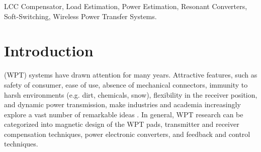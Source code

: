 \documentclass[journal,a4paper]{IEEEtran}
\begin{document}
\begin{IEEEkeywords}
LCC Compensator, Load Estimation, Power Estimation, Resonant Converters, Soft-Switching, Wireless Power Transfer Systems.
\end{IEEEkeywords}

\IEEEpeerreviewmaketitle



\section{Introduction}

 (WPT) systems have drawn attention for many years. Attractive features, such as safety of consumer, ease of use, absence of mechanical connectors, immunity to harsh environments (e.g. dirt, chemicals, snow), flexibility in the receiver position, and dynamic power transmission, make industries and academia increasingly explore a vast number of remarkable ideas \cite{ADV_1,ADV_2,ADV_3,ADV_4}. In general, WPT research can be categorized into magnetic design of the WPT pads, transmitter and receiver compensation techniques, power electronic converters, and feedback and control techniques. %

\end{document}
